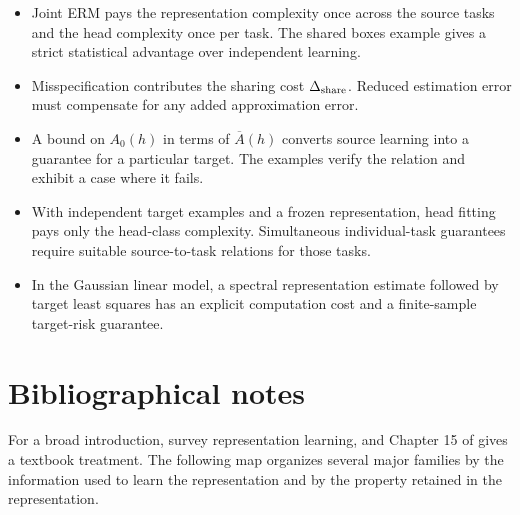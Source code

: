 \documentclass[11pt,twoside]{article}
\theoremstyle{definition}
\theoremstyle{remark}
\begin{document}
\begin{itemize}[leftmargin=*]
\item Joint ERM pays the representation complexity once across the source
tasks and the head complexity once per task. The shared boxes example gives
a strict statistical advantage over independent learning.
\item Misspecification contributes the sharing cost $\Delta_{\rm share}$.
Reduced estimation error must compensate for any added approximation error.
\item A bound on $A_0(h)$ in terms of $\overline A(h)$ converts source
learning into a guarantee for a particular target. The examples verify the
relation and exhibit a case where it fails.
\item With independent target examples and a frozen representation, head
fitting pays only the head-class complexity. Simultaneous individual-task
guarantees require suitable source-to-task relations for those tasks.
\item In the Gaussian linear model, a spectral representation estimate
followed by target least squares has an explicit computation cost and a
finite-sample target-risk guarantee.
\end{itemize}

\printendnotes

\section*{Bibliographical notes}

For a broad introduction, \citet{bengio2013} survey representation learning,
and Chapter 15 of \citet{goodfellow2016} gives a textbook treatment.
The following map organizes several major families by the information used to
learn the representation and by the property retained in the representation.
\end{document}
